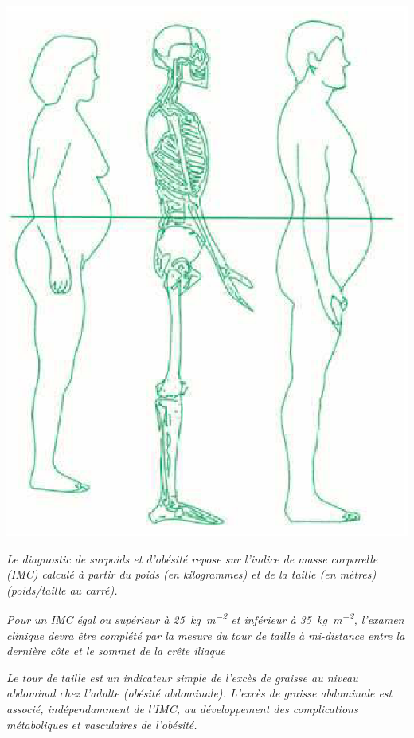 \documentclass["../Cours.tex"]{subfiles}
\begin{document}
{\begin{questions}
\begin{center}
    \includegraphics[scale=0.25]{4 - Quatrieme/problemes/Screenshot_20230524_033734.png}
\end{center}

\textit{Le diagnostic de surpoids et d’obésité repose sur l’indice de masse corporelle (IMC) calculé à partir du poids (en kilogrammes) et de la taille (en mètres) (poids/taille au carré).}

\textit{Pour un IMC égal ou supérieur à \qty{25}{\kg\per\metre\squared} et inférieur à \qty{35}{\kg\per\metre\squared}, l’examen clinique devra être complété par la mesure du tour de taille à mi-distance entre la dernière côte et le sommet de la crête iliaque} 

\textit{Le tour de taille est un indicateur simple de l’excès de graisse au niveau abdominal chez l’adulte (obésité abdominale). L’excès de graisse abdominale est associé, indépendamment de l’IMC, au développement des complications métaboliques et vasculaires de l’obésité.}


\end{questions}}
\end{document}
